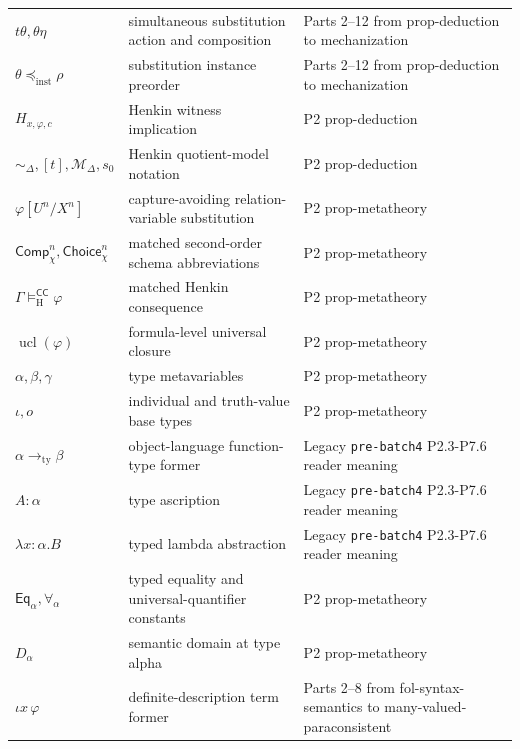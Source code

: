 \begin{longtable}{@{}p{}p{}p{}@{}}
\(t\theta,\allowbreak \theta\eta\) & simultaneous substitution action and composition & Parts 2--12 from prop-\allowbreak{}deduction to mechanization \\
\(\theta\preceq_{\mathrm{inst}}\rho\) & substitution instance preorder & Parts 2--12 from prop-\allowbreak{}deduction to mechanization \\
\(H_{x,\varphi,c}\) & Henkin witness implication & P2 prop-\allowbreak{}deduction \\
\(\sim_{\Delta},\allowbreak [t],\allowbreak \mathcal M_{\Delta},\allowbreak s_0\) & Henkin quotient-model notation & P2 prop-\allowbreak{}deduction \\
\(\varphi[U^n/X^n]\) & capture-avoiding relation-variable substitution & P2 prop-\allowbreak{}metatheory \\
\(\mathsf{Comp}_{\chi}^{n},\allowbreak \mathsf{Choice}_{\chi}^{n}\) & matched second-order schema abbreviations & P2 prop-\allowbreak{}metatheory \\
\(\Gamma\models_{\mathrm H}^{\mathsf{CC}}\varphi\) & matched Henkin consequence & P2 prop-\allowbreak{}metatheory \\
\(\operatorname{ucl}(\varphi)\) & formula-level universal closure & P2 prop-\allowbreak{}metatheory \\
\(\alpha,\allowbreak \beta,\allowbreak \gamma\) & type metavariables & P2 prop-\allowbreak{}metatheory \\
\(\iota,\allowbreak o\) & individual and truth-value base types & P2 prop-\allowbreak{}metatheory \\
\(\alpha\to_{\mathrm{ty}}\beta\) & object-language function-type former & Legacy \texttt{pre-\allowbreak{}batch4} P2.\allowbreak{}3-\allowbreak{}P7.\allowbreak{}6 reader meaning \\
\(A:\alpha\) & type ascription & Legacy \texttt{pre-\allowbreak{}batch4} P2.\allowbreak{}3-\allowbreak{}P7.\allowbreak{}6 reader meaning \\
\(\lambda x{:}\alpha.B\) & typed lambda abstraction & Legacy \texttt{pre-\allowbreak{}batch4} P2.\allowbreak{}3-\allowbreak{}P7.\allowbreak{}6 reader meaning \\
\(\mathsf{Eq}_{\alpha},\allowbreak \forall_{\alpha}\) & typed equality and universal-quantifier constants & P2 prop-\allowbreak{}metatheory \\
\(D_\alpha\) & semantic domain at type alpha & P2 prop-\allowbreak{}metatheory \\
\(\iota x\,\varphi\) & definite-description term former & Parts 2--8 from fol-\allowbreak{}syntax-\allowbreak{}semantics to many-\allowbreak{}valued-\allowbreak{}paraconsistent \\

\end{longtable}
